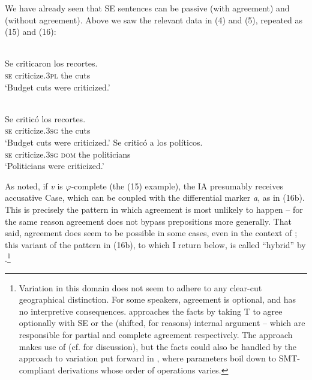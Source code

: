 \documentclass[output=paper]{langsci/langscibook}
\begin{document}
We have already seen that SE sentences can be passive (with agreement) and  (without agreement). Above we saw the relevant data in (4) and (5), repeated as (15) and (16):\largerpage[2]

\noindent\parbox{\textwidth}{\ea%
    \label{ex:gallego:15}\\
    \gll Se  criticaron        los recortes.            \\
         \textsc{se} criticize\textsc{{}.3pl}  the cuts\\
    \glt ‘Budget cuts were criticized.’
    \z}

\ea%
    \label{ex:gallego:16}\\
    \ea
    \gll Se   criticó             los  recortes.            \\
         \textsc{se} criticize\textsc{{}.3sg}  the  cuts\\
    \glt ‘Budget cuts were criticized.’
    \ex
    \gll Se  criticó             a        los  políticos.\\
         \textsc{se} criticize\textsc{{}.3sg}  \textsc{dom} the politicians\\
    \glt ‘Politicians were criticized.’
    \z
\z

As noted, if \textit{v} is $\varphi $-complete (the (15) example), the IA presumably receives accusative Case, which can be coupled with the differential marker \textit{a}, as in (16b). This is precisely the pattern in which agreement is most unlikely to happen – for the same reason agreement does not bypass prepositions more generally. That said, agreement does seem to be possible in some cases, even in the context of \DOM; this variant of the pattern in (16b), to which I return below, is called “hybrid” by \citet{RAE-ASALE2009}.\footnote{Variation in this domain does not seem to adhere to any clear-cut geographical distinction. For some speakers, agreement is optional, and has no interpretive consequences. \citet{Planells2017} approaches the facts by taking T to agree optionally with SE or the (shifted, for \DOM reasons) internal argument – which are responsible for partial and complete agreement respectively. The approach makes use of   (cf. \citealt{Gallego2013} for discussion), but the facts could also be handled by the approach to variation put forward in \citet{Obata2016}, where parameters boil down to SMT-compliant derivations whose order of operations varies.}
\end{document}
